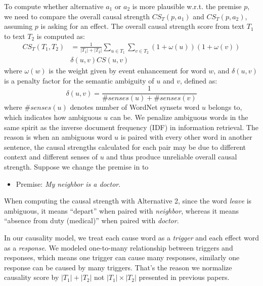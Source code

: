 To compute whether alternative $a_1$ or $a_2$ is more plausible
w.r.t. the premise $p$, we need to compare the overall causal
strength $CS_T(p, a_1)$ and $CS_T(p, a_2)$, assuming $p$ is asking
for an effect. The overall causal strength score from text $T_1$ to
text $T_2$ is computed as:
\begin{align}
CS_T(T_1,T_2)&=\frac{1}{|T_1|+|T_2|}\sum_{u \in T_1}\sum_{v \in T_2}
(1+ \omega(u))(1+ \omega(v))   \nonumber \\
& \delta(u, v) CS(u, v)
\label{eq:csall}
\end{align}
where $\omega(w)$ is the weight given by event enhancement for word $w$,
and $\delta(u,v)$ is a penalty factor for the semantic ambiguity of $u$ and
$v$, defined as:
\begin{equation}
\delta(u,v) = \frac{1}{\#senses(u)+\#senses(v)}
\end{equation}
where $\#senses(u)$ denotes number of WordNet synsets word $u$ belongs to,
which indicates how ambiguous $u$ can be.
We penalize ambiguous words in the same spirit as the inverse document frequency
(IDF) in information retrieval. The reason is when an ambiguous word $u$ is paired
with every other word in another sentence, the causal strengths calculated for
each pair may be due to different context and different senses of $u$ and thus
produce unreliable overall causal strength.
Suppose we change the premise in  to
\begin{itemize}
\item[] Premise: {\em My neighbor is a doctor}.
\end{itemize}
When computing the causal strength with Alternative 2, since the
word \emph{leave} is ambiguous, it means ``depart'' when paired with
\emph{neighbor}, whereas it means ``absence from duty (medical)''
when paired with \emph{doctor}.

In our causality model, we treat each cause word as a \emph{trigger} and each
effect word as a \emph{response}.
We modeled one-to-many relationship between triggers and responses, which
means one trigger can cause many responses, similarly one response can be caused
by many triggers.
That's the reason we normalize causality score by $|T_1|+|T_2|$ not
$|T_1|\times|T_2|$ presented in previous papers. 

%


